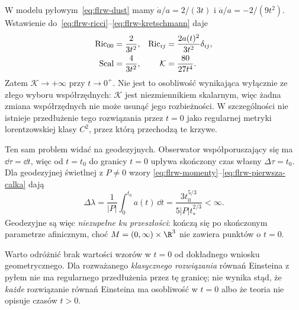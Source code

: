 \begin{przyklad}
\label{prz:flrw-osobliwosc}
W modelu pyłowym~\eqref{eq:flrw-dust} mamy
$\dot a/a=2/(3t)$ i $\ddot a/a=-2/(9t^2)$.
Wstawienie do~\eqref{eq:flrw-ricci}--\eqref{eq:flrw-kretschmann}
daje
\begin{align}\label{eq:flrw-dust-curvature}
 \mathrm{Ric}_{00}&=\frac{2}{3t^2},&
 \mathrm{Ric}_{ij}&=\frac{2a(t)^2}{3t^2}\delta_{ij},\notag\\
 \mathrm{Scal}&=\frac{4}{3t^2},&
 \mathcal K&=\frac{80}{27t^4}.
\end{align}
Zatem $\mathcal K\to+\infty$ przy $t\to0^+$.
Nie jest to osobliwość wynikająca wyłącznie ze złego wyboru
współrzędnych: $\mathcal K$ jest niezmiennikiem skalarnym,
więc żadna zmiana współrzędnych nie może usunąć jego
rozbieżności. W szczególności nie istnieje przedłużenie
tego rozwiązania przez $t=0$ jako regularnej metryki
lorentzowskiej klasy $C^2$, przez którą przechodzą te krzywe.

Ten sam problem widać na geodezyjnych.
Obserwator współporuszający się ma $\dd\tau=\dd t$,
więc od $t=t_0$ do granicy $t=0$ upływa skończony
czas własny $\Delta\tau=t_0$.
Dla geodezyjnej świetlnej z $P\ne0$ wzory
\eqref{eq:flrw-momenty}--\eqref{eq:flrw-pierwsza-calka} dają
\[
 \Delta\lambda=\frac1{|P|}\int_0^{t_0}a(t)\,\dd t
 =\frac{3t_0^{5/3}}{5|P|t_*^{2/3}}<\infty.
\]
Geodezyjne są więc \emph{niezupełne ku przeszłości}:
kończą się po skończonym parametrze afinicznym, choć
$M=(0,\infty)\times\R^3$ nie zawiera punktów o $t=0$.

Warto odróżnić brak wartości wzorów w $t=0$ od dokładnego
wniosku geometrycznego. Dla rozważanego \emph{klasycznego
rozwiązania} równań Einsteina z pyłem nie ma regularnego
przedłużenia przez tę granicę; nie wynika stąd, że
\emph{każde} rozwiązanie równań Einsteina ma osobliwość
w $t=0$ albo że teoria nie opisuje czasów $t>0$.
\end{przyklad}

